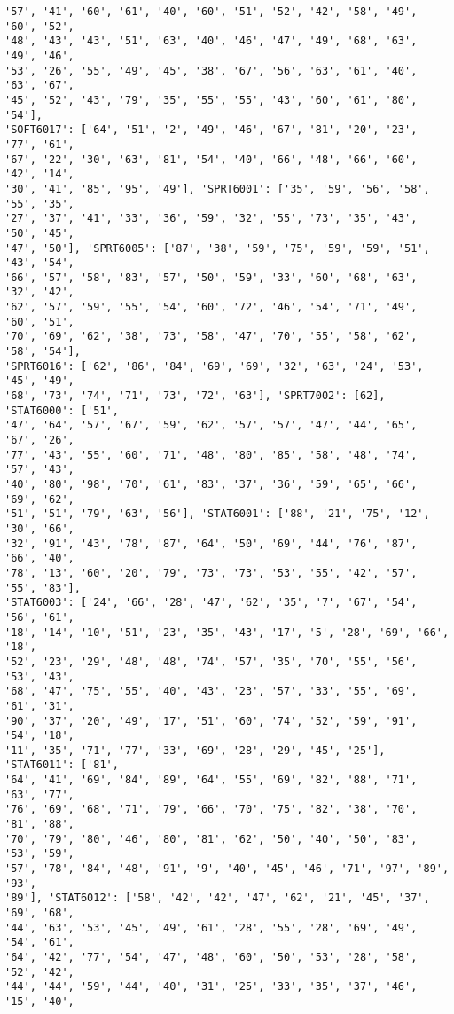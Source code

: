 \documentclass[11pt]{article}
\begin{document}
\begin{Verbatim}[commandchars=\\\{\}]
'57', '41', '60', '61', '40', '60', '51', '52', '42', '58', '49', '60', '52',
'48', '43', '43', '51', '63', '40', '46', '47', '49', '68', '63', '49', '46',
'53', '26', '55', '49', '45', '38', '67', '56', '63', '61', '40', '63', '67',
'45', '52', '43', '79', '35', '55', '55', '43', '60', '61', '80', '54'],
'SOFT6017': ['64', '51', '2', '49', '46', '67', '81', '20', '23', '77', '61',
'67', '22', '30', '63', '81', '54', '40', '66', '48', '66', '60', '42', '14',
'30', '41', '85', '95', '49'], 'SPRT6001': ['35', '59', '56', '58', '55', '35',
'27', '37', '41', '33', '36', '59', '32', '55', '73', '35', '43', '50', '45',
'47', '50'], 'SPRT6005': ['87', '38', '59', '75', '59', '59', '51', '43', '54',
'66', '57', '58', '83', '57', '50', '59', '33', '60', '68', '63', '32', '42',
'62', '57', '59', '55', '54', '60', '72', '46', '54', '71', '49', '60', '51',
'70', '69', '62', '38', '73', '58', '47', '70', '55', '58', '62', '58', '54'],
'SPRT6016': ['62', '86', '84', '69', '69', '32', '63', '24', '53', '45', '49',
'68', '73', '74', '71', '73', '72', '63'], 'SPRT7002': [62], 'STAT6000': ['51',
'47', '64', '57', '67', '59', '62', '57', '57', '47', '44', '65', '67', '26',
'77', '43', '55', '60', '71', '48', '80', '85', '58', '48', '74', '57', '43',
'40', '80', '98', '70', '61', '83', '37', '36', '59', '65', '66', '69', '62',
'51', '51', '79', '63', '56'], 'STAT6001': ['88', '21', '75', '12', '30', '66',
'32', '91', '43', '78', '87', '64', '50', '69', '44', '76', '87', '66', '40',
'78', '13', '60', '20', '79', '73', '73', '53', '55', '42', '57', '55', '83'],
'STAT6003': ['24', '66', '28', '47', '62', '35', '7', '67', '54', '56', '61',
'18', '14', '10', '51', '23', '35', '43', '17', '5', '28', '69', '66', '18',
'52', '23', '29', '48', '48', '74', '57', '35', '70', '55', '56', '53', '43',
'68', '47', '75', '55', '40', '43', '23', '57', '33', '55', '69', '61', '31',
'90', '37', '20', '49', '17', '51', '60', '74', '52', '59', '91', '54', '18',
'11', '35', '71', '77', '33', '69', '28', '29', '45', '25'], 'STAT6011': ['81',
'64', '41', '69', '84', '89', '64', '55', '69', '82', '88', '71', '63', '77',
'76', '69', '68', '71', '79', '66', '70', '75', '82', '38', '70', '81', '88',
'70', '79', '80', '46', '80', '81', '62', '50', '40', '50', '83', '53', '59',
'57', '78', '84', '48', '91', '9', '40', '45', '46', '71', '97', '89', '93',
'89'], 'STAT6012': ['58', '42', '42', '47', '62', '21', '45', '37', '69', '68',
'44', '63', '53', '45', '49', '61', '28', '55', '28', '69', '49', '54', '61',
'64', '42', '77', '54', '47', '48', '60', '50', '53', '28', '58', '52', '42',
'44', '44', '59', '44', '40', '31', '25', '33', '35', '37', '46', '15', '40',

\end{Verbatim}
\end{document}
